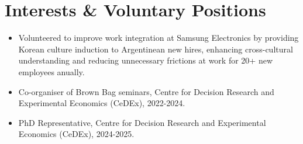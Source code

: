 \documentclass[letterpaper,11pt]{article}
\makeatletter
\newcommand{\resumeItem}[1]{
  \item\small{
    {#1 \vspace{-2pt}}
  }
}
\newcommand{\resumeProjectHeading}[2]{
    \item
    \begin{tabular*}{0.97\textwidth}{l@{\extracolsep{\fill}}r}
      \small#1 & #2 \\
    \end{tabular*}\vspace{-7pt}
}
\newcommand{\resumeSubHeadingListStart}{\begin{itemize}[leftmargin=0.15in, label={}]}
\newcommand{\resumeSubHeadingListEnd}{\end{itemize}}
\newcommand{\resumeItemListStart}{\begin{itemize}}
\newcommand{\resumeItemListEnd}{\end{itemize}\vspace{-5pt}}
\makeatother
\begin{document}
\section{Interests \& Voluntary Positions}
          \resumeItemListStart
          \resumeItem{Volunteered to improve work integration at Samsung Electronics by providing Korean culture induction to Argentinean new hires, enhancing cross-cultural understanding and reducing unnecessary frictions at work for 20+ new employees anually.}
          \resumeItem{Co-organiser of Brown Bag seminars, Centre for Decision Research and Experimental Economics (CeDEx), 2022-2024.}
          \resumeItem{PhD Representative, Centre for Decision Research and Experimental Economics (CeDEx), 2024-2025.}
          \resumeItemListEnd

        


 
\end{document}
